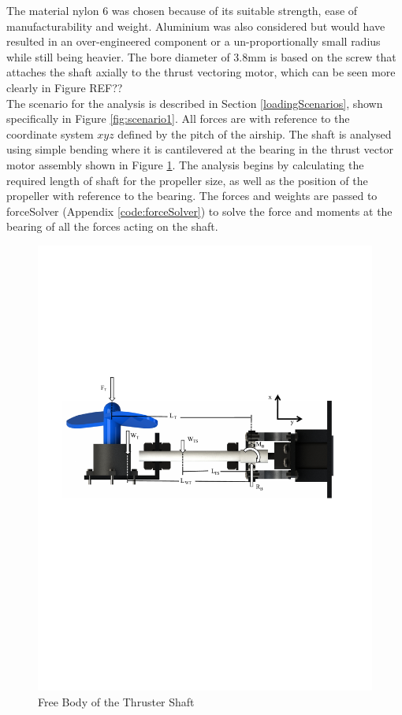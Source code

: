 \documentclass[../main.tex]{subfiles}
\begin{document}
The material nylon 6 was chosen because of its suitable strength, ease of manufacturability and weight. Aluminium was also considered but would have resulted in an over-engineered component or a un-proportionally small radius while still being heavier. The bore diameter of 3.8mm is based on the screw that attaches the shaft axially to the thrust vectoring motor, which can be seen more clearly in Figure REF??\\

The scenario for the analysis is described in Section \ref{loadingScenarios}, shown specifically in Figure \ref{fig:scenario1}. All forces are with reference to the coordinate system $xyz$ defined by the pitch of the airship. The shaft is analysed using simple bending where it is cantilevered at the bearing in the thrust vector motor assembly shown in Figure \ref{fig:thrusterShaftFBD}. The analysis begins by calculating the required length of shaft for the propeller size, as well as the position of the propeller with reference to the bearing. The forces and weights are passed to forceSolver (Appendix \ref{code:forceSolver}) to solve the force and moments at the bearing of all the forces acting on the shaft.

\begin{figure}[H]
	\centering
	\includegraphics[width=.9\linewidth]{img/analysis/thruster/thrusterShaft.pdf}
	\caption{Free Body of the Thruster Shaft}
	\label{fig:thrusterShaftFBD}
\end{figure}
\end{document}
